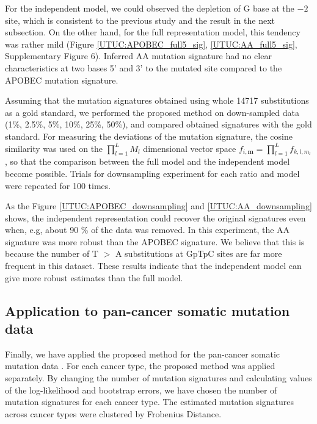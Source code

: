 For the independent model, we could observed the depletion of G base at the $-2$ site,
which is consistent to the previous study \cite{pmid23318258} and the result in the next subsection.
On the other hand, for the full representation model, this tendency was rather mild (Figure \ref{UTUC:APOBEC_full5_sig}, \ref{UTUC:AA_full5_sig}, Supplementary Figure 6).
Inferred AA mutation signature had no clear characteristics at two bases 5' and 3' to the mutated site compared to the APOBEC mutation signature.


Assuming that the mutation signatures obtained using whole 14717 substitutions as a gold standard, 
we performed the proposed method on down-sampled data (1\%, 2.5\%, 5\%, 10\%, 25\%, 50\%), 
and compared obtained signatures with the gold standard.
For measuring the deviations of the mutation signature, the cosine similarity was used on the $\prod_{l=1}^L M_l$ dimensional vector space $f_{i, \bm{m}} = \prod_{l=1}^L f_{k,l,m_l}$,
so that the comparison between the full model and the independent model become possible.
Trials for downsampling experiment for each ratio and model were repeated for 100 times.

As the Figure \ref{UTUC:APOBEC_downsampling} and \ref{UTUC:AA_downsampling} shows, 
the independent representation could recover the original signatures even when, e.g, about 90 \% of the data was removed.
In this experiment, the AA signature was more robust than the APOBEC signature.
We believe that this is because the number of T $>$ A substitutions at GpTpC sites are far more frequent in this dataset.
These results indicate that the independent model can give more robust estimates than the full model.


\subsection*{Application to pan-cancer somatic mutation data}

Finally, we have applied the proposed method for the pan-cancer somatic mutation data \cite{pmid23945592}.
For each cancer type, the proposed method was applied separately.
By changing the number of mutation signatures and calculating values of the log-likelihood and bootstrap errors,
we have chosen the number of mutation signatures for each cancer type.
The estimated mutation signatures across cancer types were clustered by Frobenius Distance.



